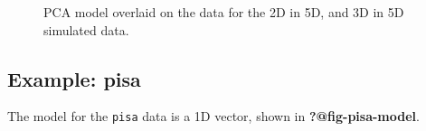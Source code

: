 \documentclass[
  letterpaper,
]{book}
\newenvironment{Shaded}{\begin{snugshade}}{\end{snugshade}}
\newcommand{\AttributeTok}[1]{\textcolor[rgb]{0.40,0.45,0.13}{#1}}
\newcommand{\ConstantTok}[1]{\textcolor[rgb]{0.56,0.35,0.01}{#1}}
\newcommand{\DecValTok}[1]{\textcolor[rgb]{0.68,0.00,0.00}{#1}}
\newcommand{\FloatTok}[1]{\textcolor[rgb]{0.68,0.00,0.00}{#1}}
\newcommand{\FunctionTok}[1]{\textcolor[rgb]{0.28,0.35,0.67}{#1}}
\newcommand{\NormalTok}[1]{\textcolor[rgb]{0.00,0.23,0.31}{#1}}
\newcommand{\SpecialCharTok}[1]{\textcolor[rgb]{0.37,0.37,0.37}{#1}}
\newcommand{\StringTok}[1]{\textcolor[rgb]{0.13,0.47,0.30}{#1}}
\begin{document}
\begin{Shaded}
\end{Shaded}

\begin{figure}

\begin{minipage}[t]{0.50\linewidth}

{\centering 

}

\end{minipage}%

\caption{\label{fig-plane-box-model}PCA model overlaid on the data for
the 2D in 5D, and 3D in 5D simulated data.}

\end{figure}

\hypertarget{example-pisa-1}{%
\subsection{Example: pisa}\label{example-pisa-1}}

The model for the \texttt{pisa} data is a 1D vector, shown in
\textbf{?@fig-pisa-model}.
\end{document}
